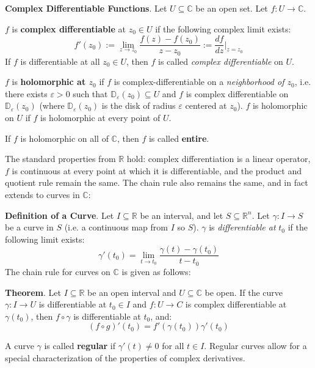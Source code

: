 \begin{framed}
    \textbf{Complex Differentiable Functions}. Let $U\subseteq\mathbb{C}$ be an open set. Let $f:U\to \mathbb{C}$.

    $f$ is \textbf{complex differentiable} at $z_0\in U$ if the following complex limit exists: \[f'(z_0):=\lim_{z\to z_0} \frac{f(z)-f(z_0)}{z-z_0} := \frac{df}{dz}\bigg|_{z=z_0}\] If $f$ is differentiable at all $z_0\in U$, then $f$ is called \textit{complex differentiable} on $U$.

    $f$ is \textbf{holomorphic at $z_0$} if $f$ is complex-differentiable on a \textit{neighborhood of $z_0$}, i.e. there exists $\varepsilon>0$ such that $\mathbb{D}_\varepsilon(z_0)\subseteq U$ and $f$ is complex differentiable on $\mathbb{D}_\varepsilon(z_0)$ (where $\mathbb{D}_\varepsilon(z_0)$ is the disk of radius $\varepsilon$ centered at $z_0$). $f$ is holomorphic on $U$ if $f$ is holomorphic at every point of $U$.

    If $f$ is holomorphic on all of $\mathbb{C}$, then $f$ is called \textbf{entire}.
\end{framed} 
\vspace{-1em}
The standard properties from $\mathbb{R}$ hold: complex differentiation is a linear operator, $f$ is continuous at every point at which it is differentiable, and the product and quotient rule remain the same. The chain rule also remains the same, and in fact extends to curves in $\mathbb{C}$:

\textbf{Definition of a Curve}. Let $I\subseteq\mathbb{R}$ be an interval, and let $S\subseteq\mathbb{R}^n$. Let $\gamma:I\to S$ be a curve in $S$ (i.e. a continuous map from $I$ so $S$). $\gamma$ is \textit{differentiable at} $t_0$ if the following limit exists: \[\gamma'(t_0) = \lim_{t\to t_0}\frac{\gamma(t)-\gamma(t_0)}{t-t_0}\] The chain rule for curves on $\mathbb{C}$ is given as follows:

\textbf{Theorem}. Let $I\subseteq \mathbb{R}$ be an open interval and $U\subseteq\mathbb{C}$ be open. If the curve $\gamma:I\to U$ is differentiable at $t_0\in I$ and $f:U\to C$ is complex differentiable at $\gamma(t_0)$, then $f\circ \gamma$ is differentiable at $t_0$, and: \[(f\circ g)'(t_0) = f'(\gamma(t_0)) \gamma' (t_0)\]

A curve $\gamma$ is called \textbf{regular} if $\gamma'(t)\neq 0$ for all $t\in I$. Regular curves allow for a special characterization of the properties of complex derivatives.

